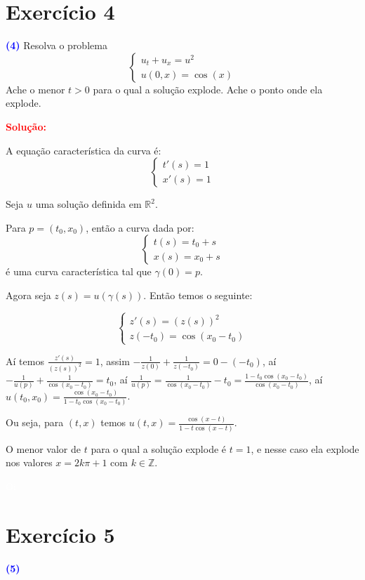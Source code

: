 \documentclass[11pt,a4paper]{article}
\newcommand{\exercicio}[1]{\section*{Exercício #1} \textcolor{blue}{\bf(#1)}}
\newcommand{\solucao}[1]{\begin{mdframed}[style=MyFrame]
\textbf{\textcolor{red}{Solução:}} #1
\end{mdframed}\textcolor{white}{Oi} \newline}
\begin{document}
\exercicio{4} Resolva o problema
\[
\left\{\begin{array}{c}
u_t + u_x = u^2 \\
u(0, x) = \cos(x)
\end{array}
\right.
\]
Ache o menor $t > 0$ para o qual a solução explode. Ache o ponto onde ela explode.

\solucao{

\noindent
A equação característica da curva é:
\begin{equation*}
    \begin{cases}
    t'(s)=1 \\
    x'(s)=1
    \end{cases}
\end{equation*}

\noindent
Seja $u$ uma solução definida em $\mathbb{R}^2$.

\smallskip
\noindent
Para $p=(t_0,x_0)$, então a curva dada por:
\begin{equation*}
    \begin{cases}
    t(s)=t_0+s \\
    x(s)=x_0+s
    \end{cases}
\end{equation*}
é uma curva característica tal que $\gamma(0)=p$.

\smallskip
\noindent
Agora seja $z(s)=u(\gamma(s))$. Então temos o seguinte:

\begin{equation*}
    \begin{cases}
    z'(s)=(z(s))^2 \\
    z(-t_0)=\cos(x_0-t_0)
    \end{cases}
\end{equation*}

\smallskip
\noindent
Aí temos $\frac{z'(s)}{(z(s))^2}=1$, assim $-\frac{1}{z(0)}+\frac{1}{z(-t_0)}=0-(-t_0)$, aí $-\frac{1}{u(p)}+\frac{1}{\cos(x_0-t_0)}=t_0$, aí $\frac{1}{u(p)}=\frac{1}{\cos(x_0-t_0)}-t_0=\frac{1-t_0\cos(x_0-t_0)}{\cos(x_0-t_0)}$, aí $u(t_0,x_0)=\frac{\cos(x_0-t_0)}{1-t_0\cos(x_0-t_0)}$.

\smallskip
\noindent
Ou seja, para $(t,x)$ temos $u(t,x)=\frac{\cos(x-t)}{1-t\cos(x-t)}$.

\medskip
\noindent
O menor valor de $t$ para o qual a solução explode é $t=1$, e nesse caso ela explode nos valores $x=2k\pi+1$ com $k\in\mathbb{Z}$.

}

\exercicio{5} 
\end{document}
